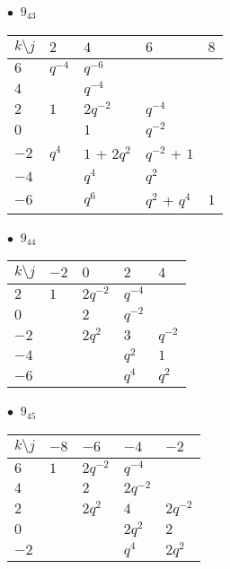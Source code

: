 %
\begin{minipage}{\linewidth}
$\bullet\ $ $9_{43}$ \vspace{0.5em} \\
\begin{tabular}{l|llll}
$k \setminus j$ & $2$ & $4$ & $6$ & $8$ \\
\hline
$6$ & $q^{-4}$ & $q^{-6}$ &  &  \\
$4$ &  & $q^{-4}$ &  &  \\
$2$ & $1$ & $2q^{-2}$ & $q^{-4}$ &  \\
$0$ &  & $1$ & $q^{-2}$ &  \\
$-2$ & $q^{4}$ & $1$ + $2q^{2}$ & $q^{-2}$ + $1$ &  \\
$-4$ &  & $q^{4}$ & $q^{2}$ &  \\
$-6$ &  & $q^{6}$ & $q^{2}$ + $q^{4}$ & $1$ \\
\end{tabular}
\vspace{2em}
\end{minipage}
%
\begin{minipage}{\linewidth}
$\bullet\ $ $9_{44}$ \vspace{0.5em} \\
\begin{tabular}{l|llll}
$k \setminus j$ & $-2$ & $0$ & $2$ & $4$ \\
\hline
$2$ & $1$ & $2q^{-2}$ & $q^{-4}$ &  \\
$0$ &  & $2$ & $q^{-2}$ &  \\
$-2$ &  & $2q^{2}$ & $3$ & $q^{-2}$ \\
$-4$ &  &  & $q^{2}$ & $1$ \\
$-6$ &  &  & $q^{4}$ & $q^{2}$ \\
\end{tabular}
\vspace{2em}
\end{minipage}
%
\begin{minipage}{\linewidth}
$\bullet\ $ $9_{45}$ \vspace{0.5em} \\
\begin{tabular}{l|llll}
$k \setminus j$ & $-8$ & $-6$ & $-4$ & $-2$ \\
\hline
$6$ & $1$ & $2q^{-2}$ & $q^{-4}$ &  \\
$4$ &  & $2$ & $2q^{-2}$ &  \\
$2$ &  & $2q^{2}$ & $4$ & $2q^{-2}$ \\
$0$ &  &  & $2q^{2}$ & $2$ \\
$-2$ &  &  & $q^{4}$ & $2q^{2}$ \\
\end{tabular}
\vspace{2em}
\end{minipage}
